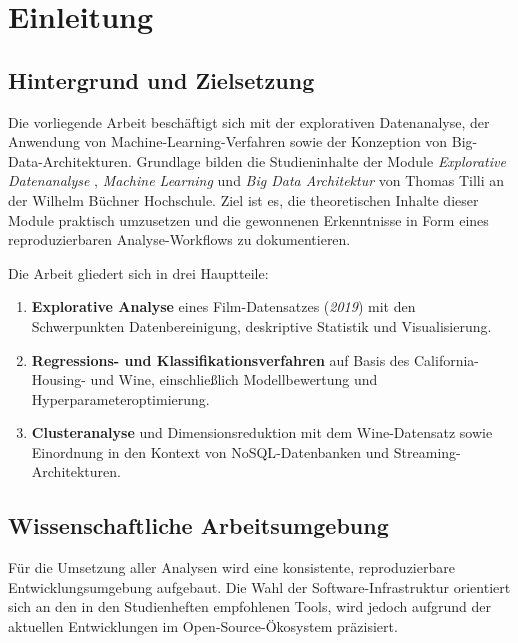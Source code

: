 
\chapter{Einleitung}
\label{chap:einleitung}
\thispagestyle{fancy}

\section{Hintergrund und Zielsetzung}

Die vorliegende Arbeit beschäftigt sich mit der explorativen Datenanalyse, der Anwendung von Machine-Learning-Verfahren sowie der Konzeption von Big-Data-Architekturen. Grundlage bilden die Studieninhalte der Module \textit{Explorative Datenanalyse} \cite{1}, \textit{Machine Learning} \cite{2} und \textit{Big Data Architektur} \cite{3} von Thomas Tilli an der Wilhelm Büchner Hochschule. Ziel ist es, die theoretischen Inhalte dieser Module praktisch umzusetzen und die gewonnenen Erkenntnisse in Form eines reproduzierbaren Analyse-Workflows zu dokumentieren.

Die Arbeit gliedert sich in drei Hauptteile:

\begin{enumerate}
    \item \textbf{Explorative Analyse} eines Film-Datensatzes (\textit{2019}) mit den Schwerpunkten Datenbereinigung, deskriptive Statistik und Visualisierung.
    \item \textbf{Regressions- und Klassifikationsverfahren} auf Basis des California-Housing- und Wine, einschließlich Modellbewertung und Hyperparameteroptimierung.
    \item \textbf{Clusteranalyse} und Dimensionsreduktion mit dem Wine-Datensatz sowie Einordnung in den Kontext von \acs{NoSQL}-Datenbanken und Streaming-Architekturen.
\end{enumerate}

\section{Wissenschaftliche Arbeitsumgebung}

Für die Umsetzung aller Analysen wird eine konsistente, reproduzierbare Entwicklungsumgebung aufgebaut. Die Wahl der Software-Infrastruktur orientiert sich an den in den Studienheften empfohlenen Tools, wird jedoch aufgrund der aktuellen Entwicklungen im Open-Source-Ökosystem präzisiert.

